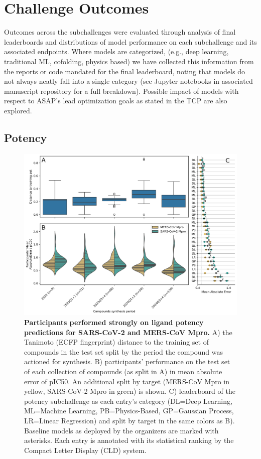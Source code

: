 \documentclass[journal=jcim,manuscript=article]{achemso}
\begin{document}
\section{Challenge Outcomes}
Outcomes across the subchallenges were evaluated through analysis of final leaderboards and distributions of model performance on each subchallenge and its associated endpoints. Where models are categorized, (e.g., deep learning, traditional ML, cofolding, physics based) we have collected this information from the reports or code mandated for the final leaderboard, noting that models do not always neatly fall into a single category (see Jupyter notebooks in associated manuscript repository for a full breakdown). Possible impact of models with respect to ASAP's lead optimization goals as stated in the TCP\cite{sars_mers_tcp} are also explored. 

\subsection{Potency}


\begin{figure}
    \includegraphics[scale=0.6]{fig4_potency_leaderboard/Figure.png}
  \caption{\textbf{Participants performed strongly on ligand potency predictions for SARS-CoV-2 and MERS-CoV Mpro.} A) the Tanimoto (ECFP fingerprint) distance to the training set of compounds in the test set split by the period the compound was actioned for synthesis. B) participants' performance on the test set of each collection of compounds (as split in A) in mean absolute error of pIC50. An additional split by target (MERS-CoV Mpro in yellow, SARS-CoV-2 Mpro in green) is shown. C) leaderboard of the potency subchallenge as each entry's category (DL=Deep Learning, ML=Machine Learning, PB=Physics-Based, GP=Gaussian Process, LR=Linear Regression) and split by target in the same colors as B). Baseline models as deployed by the organizers are marked with asterisks. Each entry is annotated with its statistical ranking by the Compact Letter Display (CLD) system\cite{cld_algorithm_2004}.}
  \label{fgr:potency_leaderboards}
\end{figure}
\end{document}
